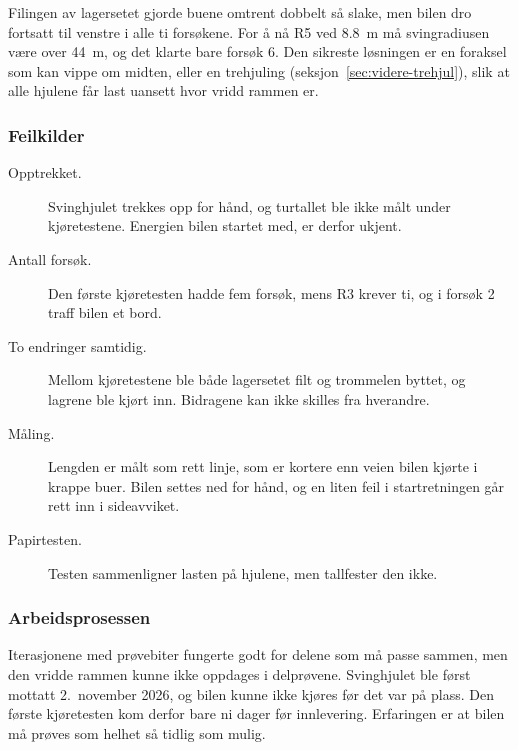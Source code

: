Filingen av lagersetet gjorde buene omtrent dobbelt så slake, men bilen dro fortsatt til venstre i alle ti forsøkene. For å nå R5 ved \SI{8,8}{m} må svingradiusen være over \SI{44}{m}, og det klarte bare forsøk 6. Den sikreste løsningen er en foraksel som kan vippe om midten, eller en trehjuling (seksjon~\ref{sec:videre-trehjul}), slik at alle hjulene får last uansett hvor vridd rammen er.

\subsubsection{Feilkilder}
\label{sec:disk-feilkilder}
\begin{description}
    \item[Opptrekket.] Svinghjulet trekkes opp for hånd, og turtallet ble ikke målt under kjøretestene. Energien bilen startet med, er derfor ukjent.
    \item[Antall forsøk.] Den første kjøretesten hadde fem forsøk, mens R3 krever ti, og i forsøk 2 traff bilen et bord.
    \item[To endringer samtidig.] Mellom kjøretestene ble både lagersetet filt og trommelen byttet, og lagrene ble kjørt inn. Bidragene kan ikke skilles fra hverandre.
    \item[Måling.] Lengden er målt som rett linje, som er kortere enn veien bilen kjørte i krappe buer. Bilen settes ned for hånd, og en liten feil i startretningen går rett inn i sideavviket.
    \item[Papirtesten.] Testen sammenligner lasten på hjulene, men tallfester den ikke.
\end{description}

\subsubsection{Arbeidsprosessen}
\label{sec:disk-prosess}
Iterasjonene med prøvebiter fungerte godt for delene som må passe sammen, men den vridde rammen kunne ikke oppdages i delprøvene. Svinghjulet ble først mottatt 2.~november 2026, og bilen kunne ikke kjøres før det var på plass. Den første kjøretesten kom derfor bare ni dager før innlevering. Erfaringen er at bilen må prøves som helhet så tidlig som mulig.

